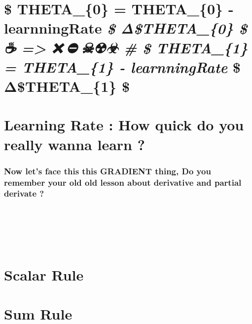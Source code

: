 \documentclass[11pt]{article}
\begin{document}
\section{\texorpdfstring{\$ THETA\_\{0\} = THETA\_\{0\} - learnningRate
\emph{\$ Δ\$THETA\_\{0\} \$ ☕ =\textgreater{} ❌🛑⛔🚫☠☢☣ \# \$ THETA\_\{1\}
= THETA\_\{1\} - learnningRate }\$ Δ\$THETA\_\{1\}
\$}{\$ THETA\_\{0\} = THETA\_\{0\} - learnningRate \$ Δ\$THETA\_\{0\} \$ ☕ =\textgreater{} ❌🛑⛔🚫☠☢☣ \# \$ THETA\_\{1\} = THETA\_\{1\} - learnningRate \$ Δ\$THETA\_\{1\} \$}}\label{theta_0-theta_0---learnningrate-ux3b4theta_0-theta_1-theta_1---learnningrate-ux3b4theta_1}

    

    \section{Learning Rate : How quick do you really wanna learn
?}\label{learning-rate-how-quick-do-you-really-wanna-learn}

    

    \subsubsection{\texorpdfstring{Now let's face this this
\textbf{GRADIENT} thing, Do you remember your old old lesson about
derivative and partial derivate
?}{Now let's face this this GRADIENT thing, Do you remember your old old lesson about derivative and partial derivate ?}}\label{now-lets-face-this-this-gradient-thing-do-you-remember-your-old-old-lesson-about-derivative-and-partial-derivate}

🧐😓😤🤮😵🤔😓😥😱😴😪🤤😭😤😞😟🧐😓😤🤮😵🤔😓😥😱😴😪🤤😭😤😞😟🧐😓😤🤮😵🤔😓😥😱😴😪🤤😭😤😞😟🧐😓😤🤮😵🤔😓😥😱😴😪🤤😭😤😞😟🧐😓😤🤮😵🤔😓😥😱😴😪🤤😭😤😞😟🧐😓😤🤮😵🤔😓😥😱😴😪🤤😭😤😞😟🧐😓😤🤮😵🤔😓😥😱😴😪🤤😭😤😞😟🧐😓😤🤮😵🤔😓😥😱😴😪🤤😭😤😞😟🧐😓😤🤮😵🤔😓😥😱😴😪🤤😭😤😞😟🧐😓😤🤮😵🤔😓😥😱😴😪🤤😭😤😞😟🧐😓😤🤮😵🤔😓😥😱😴😪🤤😭😤😞😟🧐😓😤🤮😵🤔😓😥😱😴😪🤤😭😤😞😟🧐😓😤🤮😵🤔😓😥😱😴😪🤤😭😤😞😟🧐😓😤🤮😵🤔😓😥😱😴😪🤤😭😤😞😟🧐😓😤🤮😵🤔😓😥😱😴😪🤤😭😤😞😟🧐😓😤🤮😵🤔😓😥😱😴😪🤤😭😤😞😟🧐😓😤🤮😵🤔😓😥😱😴😪🤤😭😤😞😟🧐😓😤🤮😵🤔😓😥😱😴😪🤤😭😤😞😟🧐😓😤🤮😵🤔😓😥😱😴😪🤤😭😤😞😟🧐😓😤🤮😵🤔😓😥😱😴😪🤤😭😤😞😟🧐😓😤🤮😵🤔😓😥😱😴😪🤤😭😤😞😟🧐😓😤🤮😵🤔😓😥😱😴😪🤤😭😤🧐😓😤🤮😵🤔😓😥😱😴😪🤤😭😤😞😟🧐😓😤🤮😵🤔😓😥😱😴😪🤤😭😤😞😟🧐😓😤

    \section{Scalar Rule}\label{scalar-rule}

    \section{Sum Rule}\label{sum-rule}
\end{document}
